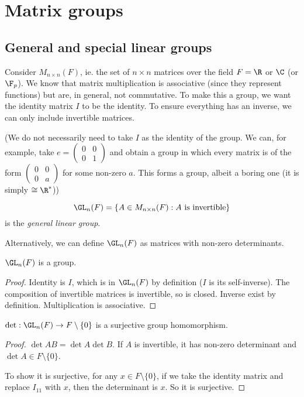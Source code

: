 \documentclass[a4paper]{article}
\begin{document}
\section{Matrix groups}
\subsection{General and special linear groups}
Consider $M_{n\times n}(F)$, ie. the set of $n\times n$ matrices over the field $F = \R$ or $\C$ (or $\F_p$). We know that matrix multiplication is associative (since they represent functions) but are, in general, not commutative. To make this a group, we want the identity matrix $I$ to be the identity. To ensure everything has an inverse, we can only include invertible matrices.

(We do not necessarily need to take $I$ as the identity of the group. We can, for example, take $e =
\begin{pmatrix}
  0 & 0\\
  0 & 1
\end{pmatrix}$ and obtain a group in which every matrix is of the form $\begin{pmatrix}
  0 & 0\\
  0 & a
\end{pmatrix}$ for some non-zero $a$. This forms a group, albeit a boring one (it is simply $\cong \R^*$))
\begin{defi}
  \[
    \GL_n(F) = \{A\in M_{n\times n}(F) : A\text{ is invertible}\}
  \]
  is the \emph{general linear group}.
\end{defi}
Alternatively, we can define $\GL_n(F)$ as matrices with non-zero determinants.

\begin{prop}
  $\GL_n(F)$ is a group.
\end{prop}
\begin{proof}
  Identity is $I$, which is in $\GL_n(F)$ by definition ($I$ is its self-inverse). The composition of invertible matrices is invertible, so is closed. Inverse exist by definition. Multiplication is associative.
\end{proof}

\begin{prop}
  $\det: \GL_n(F) \to F\setminus\{0\}$ is a surjective group homomorphism.
\end{prop}

\begin{proof}
  $\det AB = \det A\det B$. If $A$ is invertible, it has non-zero determinant and $\det A\in F\setminus\{0\}$.

  To show it is surjective, for any $x\in F\setminus\{0\}$, if we take the identity matrix and replace $I_{11}$ with $x$, then the determinant is $x$. So it is surjective.
\end{proof}
\end{document}
